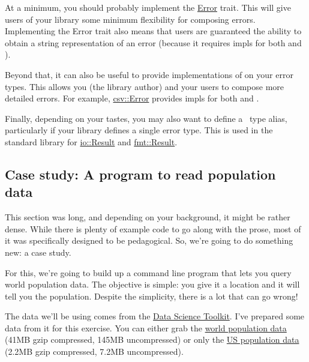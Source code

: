 \blank

At a minimum, you should probably implement the \href{https://doc.rust-lang.org/std/error/trait.Error.html}{Error} trait. 
This will give users of your library some minimum flexibility for composing errors. Implementing the Error trait also means 
that users are guaranteed the ability to obtain a string representation of an error (because it requires impls for both 
 and ).

\blank

Beyond that, it can also be useful to provide implementations of  on your error types. This allows you (the 
library author) and your users to compose more detailed errors. For example, 
\href{http://burntsushi.net/rustdoc/csv/enum.Error.html}{csv::Error} provides  impls for both  
and .

\blank

Finally, depending on your tastes, you may also want to define a \result\ type alias, particularly if your library defines a 
single error type. This is used in the standard library for \href{https://doc.rust-lang.org/std/io/type.Result.html}{io::Result} 
and \href{https://doc.rust-lang.org/std/fmt/type.Result.html}{fmt::Result}.

\subsection*{Case study: A program to read population data}

This section was long, and depending on your background, it might be rather dense. While there is plenty of example code 
to go along with the prose, most of it was specifically designed to be pedagogical. So, we're going to do something new: a 
case study.

\blank

For this, we're going to build up a command line program that lets you query world population data. The objective is simple: 
you give it a location and it will tell you the population. Despite the simplicity, there is a lot that can go wrong!

\blank

The data we'll be using comes from the \href{https://github.com/petewarden/dstkdata}{Data Science Toolkit}. I've prepared 
some data from it for this exercise. You can either grab the 
\href{http://burntsushi.net/stuff/worldcitiespop.csv.gz}{world population data} (41MB gzip compressed, 145MB uncompressed) 
or only the \href{http://burntsushi.net/stuff/uscitiespop.csv.gz}{US population data} (2.2MB gzip compressed, 7.2MB uncompressed).

